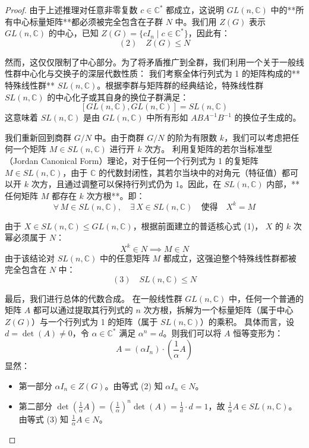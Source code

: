 \documentclass[]{article}
\begin{document}
\begin{proof}
由于上述推理对任意非零复数 $c \in \mathbb{C}^*$ 都成立，这说明 $GL(n, \mathbb{C})$ 中的**所有中心标量矩阵**都必须被完全包含在子群 $N$ 中。我们用 $Z(G)$ 表示 $GL(n, \mathbb{C})$ 的中心，已知 $Z(G) = \{ c I_n \mid c \in \mathbb{C}^* \}$，因此有：
\[ (2) \quad Z(G) \leqslant N \]

\bigskip
然而，这仅仅限制了中心部分。为了将矛盾推广到全群，我们利用一个关于一般线性群中心化与交换子的深层代数性质：
我们考察全体行列式为 1 的矩阵构成的**特殊线性群** $SL(n, \mathbb{C})$。根据李群与矩阵群的经典结论，特殊线性群 $SL(n, \mathbb{C})$ 的中心化子或其自身的换位子群满足：
\[ [GL(n, \mathbb{C}), GL(n, \mathbb{C})] = SL(n, \mathbb{C}) \]
这意味着 $SL(n, \mathbb{C})$ 是由 $GL(n, \mathbb{C})$ 中所有形如 $A B A^{-1} B^{-1}$ 的换位子生成的。

我们重新回到商群 $G/N$ 中。由于商群 $G/N$ 的阶为有限数 $k$，我们可以考虑把任何一个矩阵 $M \in SL(n, \mathbb{C})$ 进行开 $k$ 次方。
利用复矩阵的若尔当标准型（Jordan Canonical Form）理论，对于任何一个行列式为 1 的复矩阵 $M \in SL(n, \mathbb{C})$，由于 $\mathbb{C}$ 的代数封闭性，其若尔当块中的对角元（特征值）都可以开 $k$ 次方，且通过调整可以保持行列式仍为 1。因此，在 $SL(n, \mathbb{C})$ 内部，**任何矩阵 $M$ 都存在 $k$ 次方根**。即：
\[ \forall \, M \in SL(n, \mathbb{C}), \quad \exists \, X \in SL(n, \mathbb{C}) \quad \text{使得} \quad X^k = M \]

由于 $X \in SL(n, \mathbb{C}) \leqslant GL(n, \mathbb{C})$，根据前面建立的普适核心式 (1)， $X$ 的 $k$ 次幂必须属于 $N$：
\[ X^k \in N \implies M \in N \]
由于该结论对 $SL(n, \mathbb{C})$ 中的任意矩阵 $M$ 都成立，这强迫整个特殊线性群都被完全包含在 $N$ 中：
\[ (3) \quad SL(n, \mathbb{C}) \leqslant N \]

\bigskip
最后，我们进行总体的代数合成。
在一般线性群 $GL(n, \mathbb{C})$ 中，任何一个普通的矩阵 $A$ 都可以通过提取其行列式的 $n$ 次方根，拆解为一个标量矩阵（属于中心 $Z(G)$）与一个行列式为 1 的矩阵（属于 $SL(n, \mathbb{C})$）的乘积。
具体而言，设 $d = \det(A) \neq 0$，令 $\alpha \in \mathbb{C}^*$ 满足 $\alpha^n = d$。则我们可以将 $A$ 恒等变形为：
\[ A = (\alpha I_n) \cdot \left( \frac{1}{\alpha} A \right) \]
显然：
\begin{itemize}
	\item 第一部分 $\alpha I_n \in Z(G)$。由等式 (2) 知 $\alpha I_n \in N$。
	\item 第二部分 $\det(\frac{1}{\alpha} A) = (\frac{1}{\alpha})^n \det(A) = \frac{1}{d} \cdot d = 1$，故 $\frac{1}{\alpha} A \in SL(n, \mathbb{C})$。由等式 (3) 知 $\frac{1}{\alpha} A \in N$。
\end{itemize}


\end{proof}
\end{document}

